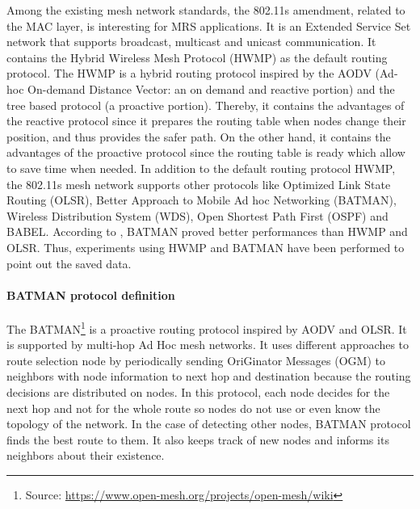 \documentclass[11pt,openany]{book}
\begin{document}
\begin{algorimth}[H]
Among the existing mesh network standards, the 802.11s amendment, related to the MAC layer, is interesting for MRS applications. It is an Extended Service Set network that supports broadcast, multicast and unicast communication. It contains the Hybrid Wireless Mesh Protocol (HWMP) as the default routing protocol. The HWMP is a hybrid routing protocol inspired by the AODV (Ad-hoc On-demand Distance Vector: an on demand and reactive portion) and the tree based protocol (a proactive portion). Thereby, it contains the advantages of the reactive protocol since it prepares the routing table when nodes change their position, and thus provides the safer path. On the other hand, it contains the advantages of the proactive protocol since the routing table is ready which allow to save time when needed. In addition to the default routing protocol HWMP, the 802.11s mesh network supports other protocols like Optimized Link State Routing (OLSR), Better Approach to Mobile Ad hoc Networking (BATMAN), Wireless Distribution System (WDS), Open Shortest Path First (OSPF) and BABEL. According to \cite{wang2010experimental}, BATMAN proved better performances than HWMP and OLSR. Thus, experiments using HWMP and BATMAN have been performed to point out the saved data.
\paragraph{BATMAN protocol  definition}
The BATMAN\footnote{Source: \url{https://www.open-mesh.org/projects/open-mesh/wiki}} is a proactive routing protocol inspired by AODV and OLSR. It is supported by multi-hop Ad Hoc mesh networks. It uses diﬀerent approaches to route selection node by periodically sending OriGinator Messages (OGM) to neighbors with node information to next hop and destination because the routing decisions are distributed on nodes. In this protocol, each node decides for the next hop and not for the whole route so nodes do not use or even know the topology of the network. In the case of detecting other nodes, BATMAN protocol ﬁnds the best route to them. It also keeps track of new nodes and informs its neighbors about their existence.

\end{algorimth}
\end{document}
